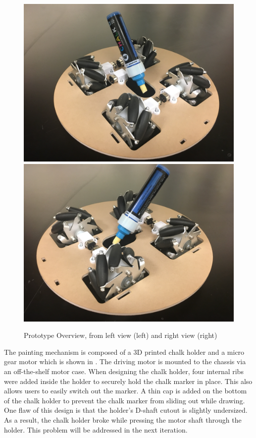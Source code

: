 \begin{figure}[h!]
\centering
\includegraphics[width=0.49\columnwidth]{CAD/full_system_1.jpeg}
\includegraphics[width=0.49\columnwidth]{CAD/full_system_2.jpeg}
\caption{Prototype Overview, from left view (left) and right view (right)}
\label{fig:em1}
\end{figure}
The painting mechanism is composed of a 3D printed chalk holder and a micro gear motor which is shown in . The driving motor is mounted to the chassis via an off-the-shelf motor case. When designing the chalk holder, four internal ribs were added inside the holder to securely hold the chalk marker in place. This also allows users to easily switch out the marker. A thin cap is added on the bottom of the chalk holder to prevent the chalk marker from sliding out while drawing. One flaw of this design is that the holder’s D-shaft cutout is slightly undersized. As a result, the chalk holder broke while pressing the motor shaft through the holder. This problem will be addressed in the next iteration. 

